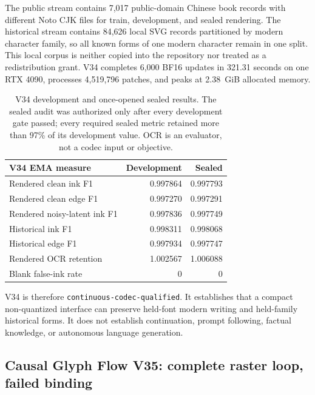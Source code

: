 \documentclass[11pt]{article}
\begin{document}
The public stream contains 7,017 public-domain Chinese book records with
different Noto CJK files for train, development, and sealed rendering. The
historical stream contains 84,626 local SVG records partitioned by modern
character family, so all known forms of one modern character remain in one
split. This local corpus is neither copied into the repository nor treated as
a redistribution grant. V34 completes 6,000 BF16 updates in 321.31 seconds on
one RTX 4090, processes 4,519,796 patches, and peaks at 2.38~GiB allocated
memory.

\begin{table}[h!]
\centering
\small
\begin{tabular}{lrr}
\toprule
V34 EMA measure & Development & Sealed \\
\midrule
Rendered clean ink F1 & 0.997864 & 0.997793 \\
Rendered clean edge F1 & 0.997270 & 0.997291 \\
Rendered noisy-latent ink F1 & 0.997836 & 0.997749 \\
Historical ink F1 & 0.998311 & 0.998068 \\
Historical edge F1 & 0.997934 & 0.997747 \\
Rendered OCR retention & 1.002567 & 1.006088 \\
Blank false-ink rate & 0 & 0 \\
\bottomrule
\end{tabular}
\caption{V34 development and once-opened sealed results. The sealed audit was
authorized only after every development gate passed; every required sealed
metric retained more than 97\% of its development value. OCR is an evaluator,
not a codec input or objective.}
\label{tab:v34codec}
\end{table}

V34 is therefore \texttt{continuous-codec-qualified}. It establishes that a
compact non-quantized interface can preserve held-font modern writing and
held-family historical forms. It does not establish continuation, prompt
following, factual knowledge, or autonomous language generation.

\subsection{Causal Glyph Flow V35: complete raster loop, failed binding}
\end{document}

